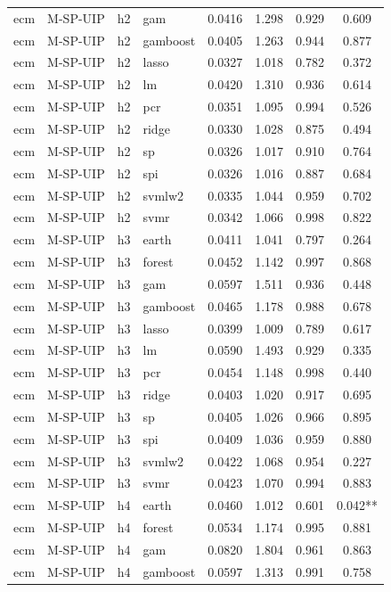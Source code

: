 \begin{ThreePartTable}
\begin{longtable}[t]{llclcccc}
ecm & M-SP-UIP & h2 & gam & 0.0416 & 1.298 & 0.929 & 0.609\\
ecm & M-SP-UIP & h2 & gamboost & 0.0405 & 1.263 & 0.944 & 0.877\\
ecm & M-SP-UIP & h2 & lasso & 0.0327 & 1.018 & 0.782 & 0.372\\
ecm & M-SP-UIP & h2 & lm & 0.0420 & 1.310 & 0.936 & 0.614\\
ecm & M-SP-UIP & h2 & pcr & 0.0351 & 1.095 & 0.994 & 0.526\\
ecm & M-SP-UIP & h2 & ridge & 0.0330 & 1.028 & 0.875 & 0.494\\
ecm & M-SP-UIP & h2 & sp & 0.0326 & 1.017 & 0.910 & 0.764\\
ecm & M-SP-UIP & h2 & spi & 0.0326 & 1.016 & 0.887 & 0.684\\
ecm & M-SP-UIP & h2 & svmlw2 & 0.0335 & 1.044 & 0.959 & 0.702\\
ecm & M-SP-UIP & h2 & svmr & 0.0342 & 1.066 & 0.998 & 0.822\\
\addlinespace
ecm & M-SP-UIP & h3 & earth & 0.0411 & 1.041 & 0.797 & 0.264\\
ecm & M-SP-UIP & h3 & forest & 0.0452 & 1.142 & 0.997 & 0.868\\
ecm & M-SP-UIP & h3 & gam & 0.0597 & 1.511 & 0.936 & 0.448\\
ecm & M-SP-UIP & h3 & gamboost & 0.0465 & 1.178 & 0.988 & 0.678\\
ecm & M-SP-UIP & h3 & lasso & 0.0399 & 1.009 & 0.789 & 0.617\\
ecm & M-SP-UIP & h3 & lm & 0.0590 & 1.493 & 0.929 & 0.335\\
ecm & M-SP-UIP & h3 & pcr & 0.0454 & 1.148 & 0.998 & 0.440\\
ecm & M-SP-UIP & h3 & ridge & 0.0403 & 1.020 & 0.917 & 0.695\\
ecm & M-SP-UIP & h3 & sp & 0.0405 & 1.026 & 0.966 & 0.895\\
ecm & M-SP-UIP & h3 & spi & 0.0409 & 1.036 & 0.959 & 0.880\\
ecm & M-SP-UIP & h3 & svmlw2 & 0.0422 & 1.068 & 0.954 & 0.227\\
ecm & M-SP-UIP & h3 & svmr & 0.0423 & 1.070 & 0.994 & 0.883\\
\addlinespace
ecm & M-SP-UIP & h4 & earth & 0.0460 & 1.012 & 0.601 & 0.042**\\
ecm & M-SP-UIP & h4 & forest & 0.0534 & 1.174 & 0.995 & 0.881\\
ecm & M-SP-UIP & h4 & gam & 0.0820 & 1.804 & 0.961 & 0.863\\
ecm & M-SP-UIP & h4 & gamboost & 0.0597 & 1.313 & 0.991 & 0.758\\

\end{longtable}
\end{ThreePartTable}
